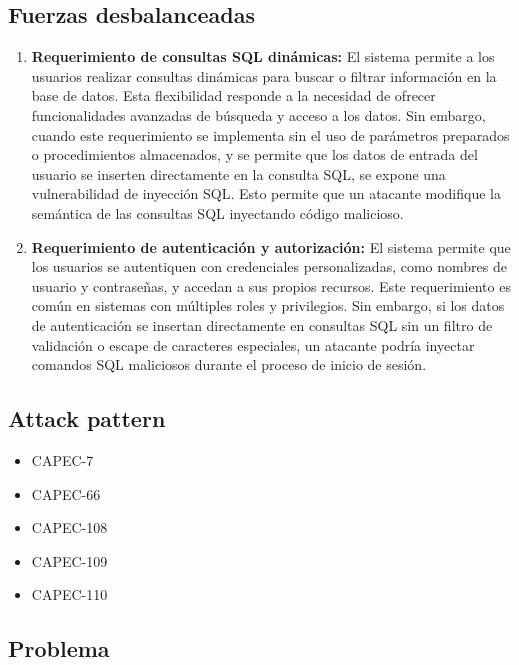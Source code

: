 \subsection{Fuerzas desbalanceadas}

\begin{enumerate}
    \item \textbf{Requerimiento de consultas SQL dinámicas: }El sistema permite a los usuarios realizar consultas dinámicas para buscar o filtrar información en la base de datos. Esta flexibilidad responde a la necesidad de ofrecer funcionalidades avanzadas de búsqueda y acceso a los datos. Sin embargo, cuando este requerimiento se implementa sin el uso de parámetros preparados o procedimientos almacenados, y se permite que los datos de entrada del usuario se inserten directamente en la consulta SQL, se expone una vulnerabilidad de inyección SQL. Esto permite que un atacante modifique la semántica de las consultas SQL inyectando código malicioso.
    \item \textbf{Requerimiento de autenticación y autorización:} El sistema permite que los usuarios se autentiquen con credenciales personalizadas, como nombres de usuario y contraseñas, y accedan a sus propios recursos. Este requerimiento es común en sistemas con múltiples roles y privilegios. Sin embargo, si los datos de autenticación se insertan directamente en consultas SQL sin un filtro de validación o escape de caracteres especiales, un atacante podría inyectar comandos SQL maliciosos durante el proceso de inicio de sesión. \\
\end{enumerate}

\subsection{Attack pattern}

\begin{itemize}
    \item CAPEC-7
    \item CAPEC-66
    \item CAPEC-108
    \item CAPEC-109
    \item CAPEC-110 
\end{itemize}

\subsection{Problema}

